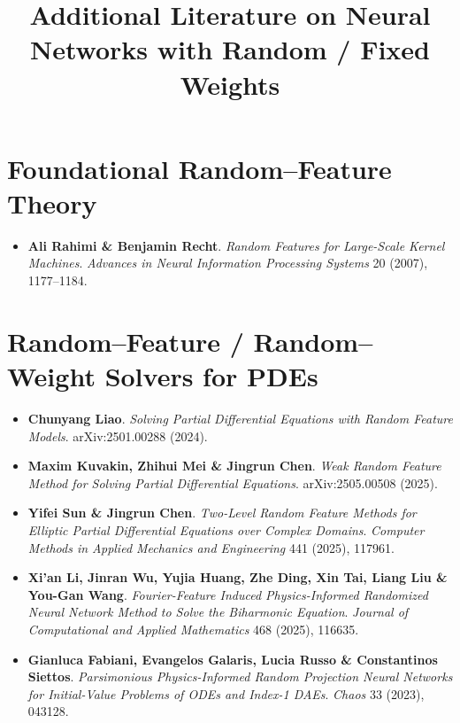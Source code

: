 \documentclass[11pt]{article}
\title{Additional Literature on Neural Networks with Random / Fixed Weights}
\author{}
\date{}
\begin{document}
\maketitle

\section{Foundational Random--Feature Theory}
\begin{itemize}[leftmargin=1.2em]
  \item \textbf{Ali Rahimi \& Benjamin Recht}.  
        \emph{Random Features for Large-Scale Kernel Machines}.  
        \textit{Advances in Neural Information Processing Systems} 20 (2007), 1177--1184.\@
\end{itemize}

\section{Random--Feature / Random--Weight Solvers for PDEs}
\begin{itemize}[leftmargin=1.2em]
  \item \textbf{Chunyang Liao}.  
        \emph{Solving Partial Differential Equations with Random Feature Models}.  
        arXiv:2501.00288 (2024).

  \item \textbf{Maxim Kuvakin, Zhihui Mei \& Jingrun Chen}.  
        \emph{Weak Random Feature Method for Solving Partial Differential Equations}.  
        arXiv:2505.00508 (2025).

  \item \textbf{Yifei Sun \& Jingrun Chen}.  
        \emph{Two-Level Random Feature Methods for Elliptic Partial Differential Equations over Complex Domains}.  
        \textit{Computer Methods in Applied Mechanics and Engineering} 441 (2025), 117961.

  \item \textbf{Xi'an Li, Jinran Wu, Yujia Huang, Zhe Ding, Xin Tai, Liang Liu \& You-Gan Wang}.  
        \emph{Fourier-Feature Induced Physics-Informed Randomized Neural Network Method to Solve the Biharmonic Equation}.  
        \textit{Journal of Computational and Applied Mathematics} 468 (2025), 116635.

  \item \textbf{Gianluca Fabiani, Evangelos Galaris, Lucia Russo \& Constantinos Siettos}.  
        \emph{Parsimonious Physics-Informed Random Projection Neural Networks for Initial-Value Problems of ODEs and Index-1 DAEs}.  
        \textit{Chaos} 33 (2023), 043128.
\end{itemize}
\end{document}

